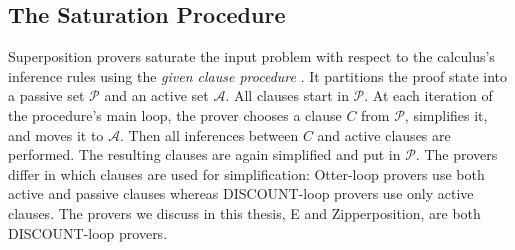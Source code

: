 \subsection{The Saturation Procedure}

Superposition provers saturate the input problem with respect to the calculus's
inference rules using the \emph{given clause procedure}
\cite{mcw-1997-otter,adf-1995-discount}. It partitions the proof state into a
passive set $\mathcal{P}$ and an active set $\mathcal{A}$. All clauses start in
$\mathcal{P}$. At each iteration of the procedure's main loop, the prover
chooses a clause $C$ from $\mathcal{P}$, simplifies it, and moves it to
$\mathcal{A}$. Then all inferences between $C$ and active clauses are performed.
The resulting clauses are again simplified and put in $\mathcal{P}$.
The provers differ in which clauses are used for simplification: Otter-loop
\cite{mcw-1997-otter} provers use both active and passive clauses whereas
DISCOUNT-loop \cite{adf-1995-discount} provers use only active clauses.
The provers we discuss in this thesis, E and Zipperposition, are both DISCOUNT-loop provers.
